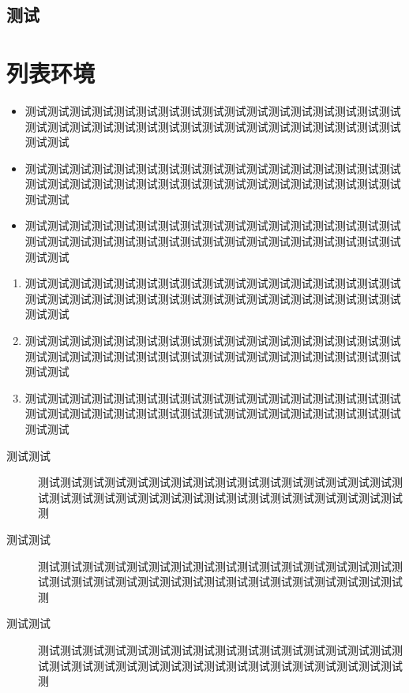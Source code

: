 \zhlipsum[1-10][name=zhufu]

\subsection{测试}

\zhlipsum[11-20][name=zhufu]

\section{列表环境}

\begin{itemize}
    \item 测试测试测试测试测试测试测试测试测试测试测试测试测试测试测试测试测试测试测试测试测试测试测试测试测试测试测试测试测试测试测试测试测试测试测试测试
    \item 测试测试测试测试测试测试测试测试测试测试测试测试测试测试测试测试测试测试测试测试测试测试测试测试测试测试测试测试测试测试测试测试测试测试测试测试
    \item 测试测试测试测试测试测试测试测试测试测试测试测试测试测试测试测试测试测试测试测试测试测试测试测试测试测试测试测试测试测试测试测试测试测试测试测试
\end{itemize}

\begin{enumerate}
    \item 测试测试测试测试测试测试测试测试测试测试测试测试测试测试测试测试测试测试测试测试测试测试测试测试测试测试测试测试测试测试测试测试测试测试测试测试
    \item 测试测试测试测试测试测试测试测试测试测试测试测试测试测试测试测试测试测试测试测试测试测试测试测试测试测试测试测试测试测试测试测试测试测试测试测试
    \item 测试测试测试测试测试测试测试测试测试测试测试测试测试测试测试测试测试测试测试测试测试测试测试测试测试测试测试测试测试测试测试测试测试测试测试测试
\end{enumerate}

\begin{description}
    \item[测试测试] 测试测试测试测试测试测试测试测试测试测试测试测试测试测试测试测试测试测试测试测试测试测试测试测试测试测试测试测试测试测试测试测试测试测
    \item[测试测试] 测试测试测试测试测试测试测试测试测试测试测试测试测试测试测试测试测试测试测试测试测试测试测试测试测试测试测试测试测试测试测试测试测试测
    \item[测试测试] 测试测试测试测试测试测试测试测试测试测试测试测试测试测试测试测试测试测试测试测试测试测试测试测试测试测试测试测试测试测试测试测试测试测
\end{description}

